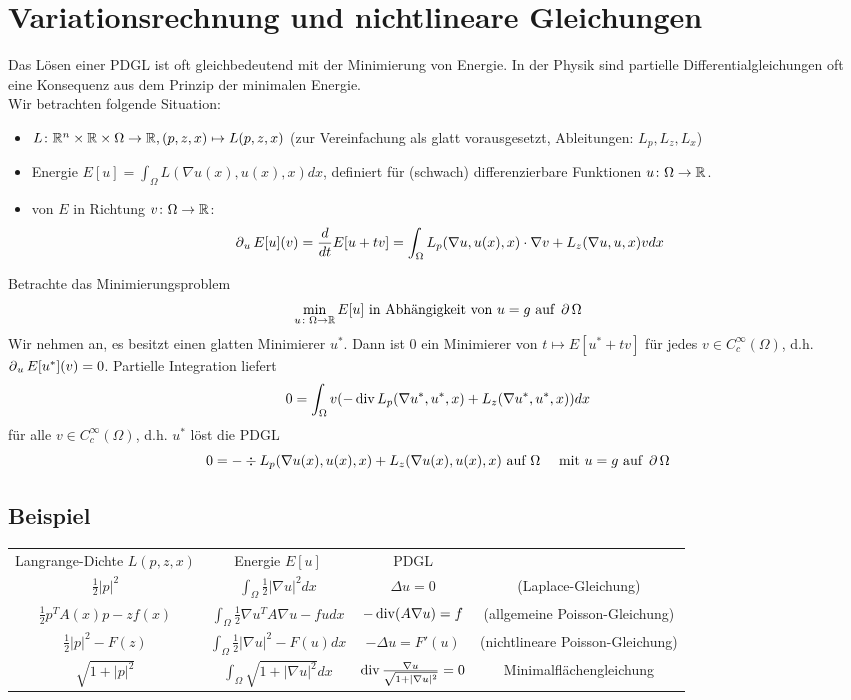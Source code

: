 \section{Variationsrechnung und nichtlineare Gleichungen}
\label{sec:para10}
	Das Lösen einer PDGL ist oft gleichbedeutend mit der Minimierung von Energie. In der Physik sind partielle Differentialgleichungen oft eine Konsequenz aus dem Prinzip der minimalen Energie. \\
	Wir betrachten folgende Situation:
	\begin{itemize}
		\item {} $L\colon \mathbb{R}^n \times \mathbb{R} \times \Omega \rightarrow \mathbb{R}, (p,z,x) \mapsto L(p,z,x)$ (zur Vereinfachung als glatt vorausgesetzt, Ableitungen: $L_p,L_z,L_x$)
		\item Energie $E[u] = \int_\Omega L(\nabla u(x),u(x),x)dx$, definiert für (schwach) differenzierbare Funktionen $u\colon \Omega \rightarrow \mathbb{R}$.
		\item {} von $E$ in Richtung $v\colon \Omega \rightarrow \mathbb{R}$:
		\[ \operatorname{\partial}_u E[u](v) = \frac{d}{dt} E[u+tv] = \int_{\Omega} L_p(\nabla u,u(x),x) \cdot \nabla v + L_z(\nabla u, u, x) v dx \]
	\end{itemize}
	Betrachte das Minimierungsproblem
	\[ \min_{u \colon \Omega \rightarrow \mathbb{R}} E[u] \text{ in Abhängigkeit von } u = g \text{ auf } \operatorname{\partial} \Omega \]
	Wir nehmen an, es besitzt einen glatten Minimierer $u^*$. Dann ist 0 ein Minimierer von $t \mapsto E[u^*+tv]$ für jedes $v \in C_c^\infty(\Omega)$, d.h. $\operatorname{\partial}_u E[u^*](v) = 0$. Partielle Integration liefert
	\[ 0 = \int_{\Omega} v(-\operatorname{div} L_p(\nabla u^*,u^*,x) + L_z(\nabla u^*,u^*,x)) dx \]
	für alle $v \in C_c^\infty (\Omega)$, d.h. $u^*$ löst die PDGL
	\[ 0 = -\div L_p(\nabla u(x),u(x),x) + L_z(\nabla u(x),u(x),x) \text{ auf } \Omega \quad \text{ mit } u = g \text{ auf } \operatorname{\partial} \Omega \]
	
\subsection{Beispiel}
\label{bsp_75}
\marginnote{[75]} \begin{tabular}{cccc}
Langrange-Dichte $L(p,z,x)$ & Energie $E[u]$ & PDGL &  \\ 
$\frac{1}{2} |p|^2$ & $\int_\Omega \frac{1}{2} |\nabla u|^2 dx$ & $\Delta u = 0$ & (Laplace-Gleichung) \\ 
$\frac{1}{2} p^T A(x)p - zf(x)$ & $\int_\Omega \frac{1}{2} \nabla u^T A \nabla u - fu dx$ & $-\operatorname{div}(A\nabla u) = f$ & (allgemeine Poisson-Gleichung) \\ 
$\frac{1}{2} |p|^2 - F(z)$ & $\int_\Omega \frac{1}{2} |\nabla u|^2 - F(u) dx$ & $-\Delta u = F'(u)$ & (nichtlineare Poisson-Gleichung) \\ 
$\sqrt{1+|p|^2}$ & $\int_\Omega \sqrt{1+ |\nabla u|^2} dx$ & $\operatorname{div} \frac{\nabla u}{\sqrt{1+ |\nabla u|^2}} = 0$ & Minimalflächengleichung \\ 
\end{tabular} 

